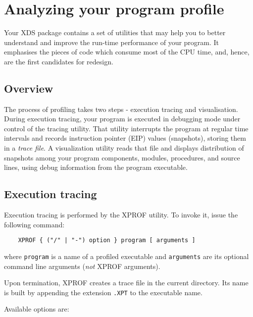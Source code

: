 \chapter{Analyzing your program profile}
\label{profiler}

Your XDS package contains a set of utilities that may help you
to better understand and improve the run-time performance of your
program. It emphasises the pieces of code which consume most of
the CPU time, and, hence, are the first candidates for redesign.

\section{Overview}
\label{profiler:overview}

The process of profiling takes two steps - execution tracing
and visualisation. During execution tracing, your program
is executed in debugging mode under control
of the tracing utility. That utility interrupts the program
at regular time intervals and records instruction pointer (EIP)
values (snapshots), storing them in a {\it trace file}.
A visualization utility reads that file and displays distribution
of snapshots among your program components, modules, procedures,
and source lines, using debug information from the program executable.

\section{Execution tracing}
\label{profiler:tracing}

Execution tracing is performed by the XPROF utility. To invoke it,
issue the following command:

\verb'    XPROF { ("/" | "-") option } program [ arguments ]'

where \verb'program' is a name of a profiled executable and
\verb'arguments' are its optional command line arguments ({\it not}
XPROF arguments).

Upon termination, XPROF creates a trace file in the current directory.
Its name is built by appending the extension \verb'.XPT' to the executable name.

Available options are:

